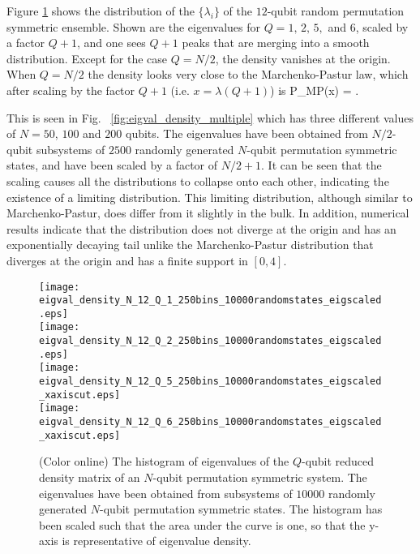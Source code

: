 \documentclass[pre,aps,showpacs,showkeys,twocolumn]{revtex4-1}
\theoremstyle{definition}
\theoremstyle{remark}
\begin{document}
Figure \ref{fig:eigval_density_single} shows the distribution of the $\{ \lambda_i \}$  of the $12$-qubit random permutation symmetric ensemble. Shown are the eigenvalues for $Q = 1,\,2,\,5,$ and $6$, scaled by a factor $Q + 1$, and one sees $Q + 1$ peaks that are merging into a smooth distribution. Except for the case $Q = N/2$, the density vanishes at the origin. When $Q = N/2$ the density looks very close to the Marchenko-Pastur law, which after scaling by the factor $Q+1$ (i.e. $x = \lambda (Q + 1)$) is 
\beq
\label{eq:MP}
P_{MP}(x) =  . 
\eeq

This is seen in  Fig.~ \ref{fig:eigval_density_multiple}  which has three different values of $N = 50$, $100$ and $200$ qubits. The eigenvalues have been obtained from $N/2$-qubit subsystems of $2500$ randomly generated $N$-qubit permutation symmetric states, and have been scaled by a factor of $N/2 + 1$. It can be seen that the scaling causes all the distributions to collapse onto each other, indicating the existence of a limiting distribution. This limiting distribution, although similar to Marchenko-Pastur, does differ from it slightly in the bulk. In addition, numerical results indicate that the distribution does not diverge at the origin and has an exponentially decaying tail unlike the Marchenko-Pastur distribution that diverges at the origin and has a finite support in $[0, 4]$.

\begin{figure}[!htbp]
    \texttt{[image: eigval\_density\_N\_12\_Q\_1\_250bins\_10000randomstates\_eigscaled.eps]}
    \\
    \texttt{[image: eigval\_density\_N\_12\_Q\_2\_250bins\_10000randomstates\_eigscaled.eps]}
    \\
    \texttt{[image: eigval\_density\_N\_12\_Q\_5\_250bins\_10000randomstates\_eigscaled\_xaxiscut.eps]}
    \\
    \texttt{[image: eigval\_density\_N\_12\_Q\_6\_250bins\_10000randomstates\_eigscaled\_xaxiscut.eps]}
    
    \caption{(Color online) The histogram of eigenvalues of the $Q$-qubit reduced density matrix of an $N$-qubit permutation symmetric system. The eigenvalues have been obtained from subsystems of $10000$ randomly generated $N$-qubit permutation symmetric states. The histogram has been scaled such that the area under the curve is one, so that the y-axis is representative of eigenvalue density.}
    \label{fig:eigval_density_single}
\end{figure}
\end{document}
